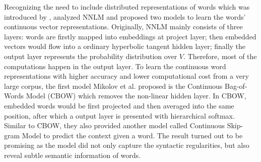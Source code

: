 \documentclass[12pt]{diazessay} %
\begin{document}
Recognizing the need to include distributed representations of words which was introduced by \citep{hinton1984distributed}, \citep{mikolov2013efficient} analyzed NNLM and proposed two models to learn the words' continuous vector representations. Originally, NNLM mainly consists of three layers: words are firstly mapped into embeddings at project layer; then embedded vectors would flow into a ordinary hyperbolic tangent hidden layer; finally the output layer represents the probability distribution over $V$. Therefore, most of the computations happen in the output layer. To learn the continuous word representations with higher accuracy and lower computational cost from a very large corpus, the first model Mikolov et al. proposed is the Continuous Bag-of-Words Model (CBOW) which removes the non-linear hidden layer. In CBOW, embedded words would be first projected and then averaged into the same position, after which a output layer is presented with hierarchical softmax. Similar to CBOW, they also provided another model called Continuous Skip-gram Model to predict the context given a word. The result turned out to be promising as the model did not only capture the syntactic regularities, but also reveal subtle semantic information of words.








\end{document}
